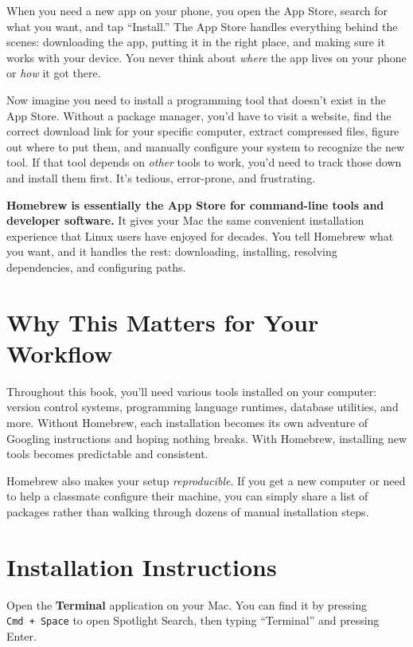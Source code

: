 \documentclass[
  letterpaper,
  DIV=11,
  numbers=noendperiod]{scrreprt}
\begin{document}
When you need a new app on your phone, you open the App Store, search
for what you want, and tap ``Install.'' The App Store handles everything
behind the scenes: downloading the app, putting it in the right place,
and making sure it works with your device. You never think about
\emph{where} the app lives on your phone or \emph{how} it got there.

Now imagine you need to install a programming tool that doesn't exist in
the App Store. Without a package manager, you'd have to visit a website,
find the correct download link for your specific computer, extract
compressed files, figure out where to put them, and manually configure
your system to recognize the new tool. If that tool depends on
\emph{other} tools to work, you'd need to track those down and install
them first. It's tedious, error-prone, and frustrating.

\textbf{Homebrew is essentially the App Store for command-line tools and
developer software.} It gives your Mac the same convenient installation
experience that Linux users have enjoyed for decades. You tell Homebrew
what you want, and it handles the rest: downloading, installing,
resolving dependencies, and configuring paths.

\section{Why This Matters for Your
Workflow}\label{why-this-matters-for-your-workflow}

Throughout this book, you'll need various tools installed on your
computer: version control systems, programming language runtimes,
database utilities, and more. Without Homebrew, each installation
becomes its own adventure of Googling instructions and hoping nothing
breaks. With Homebrew, installing new tools becomes predictable and
consistent.

Homebrew also makes your setup \emph{reproducible}. If you get a new
computer or need to help a classmate configure their machine, you can
simply share a list of packages rather than walking through dozens of
manual installation steps.

\section{Installation Instructions}\label{installation-instructions}

Open the \textbf{Terminal} application on your Mac. You can find it by
pressing \texttt{Cmd\ +\ Space} to open Spotlight Search, then typing
``Terminal'' and pressing Enter.
\end{document}
